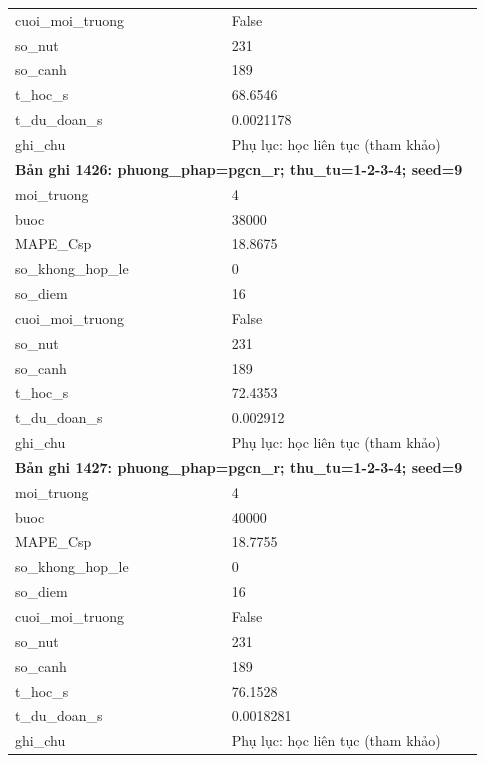\begin{longtable}{p{0.43\linewidth}p{0.50\linewidth}}
cuoi\_\allowbreak moi\_\allowbreak truong & False \\
so\_\allowbreak nut & 231 \\
so\_\allowbreak canh & 189 \\
t\_\allowbreak hoc\_\allowbreak s & 68.6546 \\
t\_\allowbreak du\_\allowbreak doan\_\allowbreak s & 0.0021178 \\
ghi\_\allowbreak chu & Phụ lục: học liên tục (tham khảo) \\
\midrule
\multicolumn{2}{p{0.95\linewidth}}{\textbf{Bản ghi 1426: phuong\_phap=pgcn\_r; thu\_tu=1-2-3-4; seed=9}} \\
moi\_\allowbreak truong & 4 \\
buoc & 38000 \\
MAPE\_\allowbreak Csp & 18.8675 \\
so\_\allowbreak khong\_\allowbreak hop\_\allowbreak le & 0 \\
so\_\allowbreak diem & 16 \\
cuoi\_\allowbreak moi\_\allowbreak truong & False \\
so\_\allowbreak nut & 231 \\
so\_\allowbreak canh & 189 \\
t\_\allowbreak hoc\_\allowbreak s & 72.4353 \\
t\_\allowbreak du\_\allowbreak doan\_\allowbreak s & 0.002912 \\
ghi\_\allowbreak chu & Phụ lục: học liên tục (tham khảo) \\
\midrule
\multicolumn{2}{p{0.95\linewidth}}{\textbf{Bản ghi 1427: phuong\_phap=pgcn\_r; thu\_tu=1-2-3-4; seed=9}} \\
moi\_\allowbreak truong & 4 \\
buoc & 40000 \\
MAPE\_\allowbreak Csp & 18.7755 \\
so\_\allowbreak khong\_\allowbreak hop\_\allowbreak le & 0 \\
so\_\allowbreak diem & 16 \\
cuoi\_\allowbreak moi\_\allowbreak truong & False \\
so\_\allowbreak nut & 231 \\
so\_\allowbreak canh & 189 \\
t\_\allowbreak hoc\_\allowbreak s & 76.1528 \\
t\_\allowbreak du\_\allowbreak doan\_\allowbreak s & 0.0018281 \\
ghi\_\allowbreak chu & Phụ lục: học liên tục (tham khảo) \\

\end{longtable}
